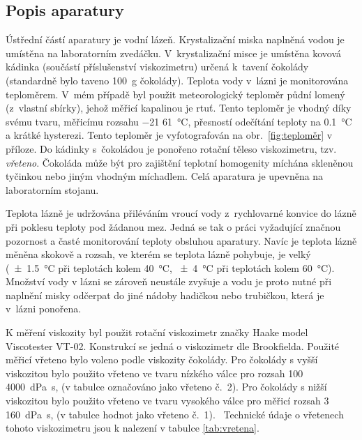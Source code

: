 \documentclass[12pt]{article}
\begin{document}
\subsection{Popis aparatury}
Ústřední částí aparatury je vodní lázeň. Krystalizační miska naplněná vodou je umístěna na laboratorním zvedáčku. V~krystalizační misce je umístěna kovová kádinka (součástí příslušenství viskozimetru) určená k~tavení čokolády (standardně bylo taveno \SI{100}{\gram} čokolády). Teplota vody v~lázni je monitorována teploměrem. \label{sec:teploměr}
V~mém případě byl použit meteorologický teploměr půdní lomený (z~vlastní sbírky), jehož měřicí kapalinou je rtuť. Tento teploměr je vhodný díky svému tvaru, měřicímu rozsahu \SI{-21}{} \hspace{-4pt} \textendash \hspace{0pt} \SI{61}{\degreeCelsius}, přesností odečítání teploty na \SI{0,1}{\degreeCelsius} a krátké hysterezi. Tento teploměr je vyfotografován na obr.~\ref{fig:teploměr} v příloze. Do kádinky s~čokoládou je ponořeno rotační těleso viskozimetru, tzv. \emph{vřeteno}. Čokoláda může být pro zajištění teplotní homogenity míchána skleněnou tyčinkou nebo jiným vhodným míchadlem. Celá aparatura je upevněna na laboratorním stojanu.
\par Teplota lázně je udržována přiléváním vroucí vody z~rychlovarné konvice do lázně při poklesu teploty pod žádanou mez. Jedná se tak o práci vyžadující značnou pozornost a časté monitorování teploty obsluhou aparatury. Navíc je teplota lázně měněna skokově a rozsah, ve kterém se teplota lázně pohybuje, je velký (\SI{\pm 1,5}{\degreeCelsius} při teplotách kolem \SI{40}{\degreeCelsius}, \SI{\pm 4}{\degreeCelsius} při teplotách kolem \SI{60}{\degreeCelsius}). Množství vody v lázni se zároveň neustále zvyšuje a vodu je proto nutné při naplnění misky odčerpat do jiné nádoby hadičkou nebo trubičkou, která je v~lázni ponořena.
\par
\label{Vřetena}K měření viskozity byl použit rotační viskozimetr značky Haake model Viscotester VT-02. Konstrukcí se jedná o viskozimetr dle Brookfielda. Použité měřicí vřeteno bylo voleno podle viskozity čokolády. Pro čokolády s vyšší viskozitou bylo použito vřeteno ve tvaru nízkého válce pro rozsah \SI{100}{} \hspace{-4pt} \textendash \hspace{0pt} \SI{4000}{\deci\pascal\second}, (v tabulce označováno jako vřeteno č.~2). Pro čokolády s nižší viskozitou bylo použito vřeteno ve tvaru vysokého válce pro měřicí rozsah \SI{3}{} \hspace{-4pt} \textendash \hspace{0pt} \SI{160}{\deci\pascal\second}, (v tabulce hodnot jako vřeteno č.~1).~\cite{man:VT-02} Technické údaje o vřetenech tohoto viskozimetru jsou k nalezení v tabulce \ref{tab:vretena}.
\end{document}
